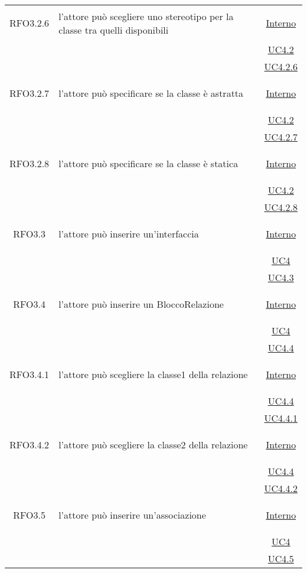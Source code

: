 \begin{longtable}{|c|>{\centering}m{7cm}|c|}
\hypertarget{RFO3.2.6}{RFO3.2.6} & l'attore può scegliere uno stereotipo per la classe tra quelli disponibili & \hyperlink{Interno}{Interno}\\
& &\hyperref[UC4.2]{UC4.2}\\
& &\hyperref[UC4.2.6]{UC4.2.6}\\ \hline

\hypertarget{RFO3.2.7}{RFO3.2.7} & l'attore può specificare se la classe è astratta & \hyperlink{Interno}{Interno}\\
& &\hyperref[UC4.2]{UC4.2}\\
& &\hyperref[UC4.2.7]{UC4.2.7}\\ \hline

\hypertarget{RFO3.2.8}{RFO3.2.8} & l'attore può specificare se la classe è statica & \hyperlink{Interno}{Interno}\\
& &\hyperref[UC4.2]{UC4.2}\\
& &\hyperref[UC4.2.8]{UC4.2.8}\\ \hline

\hypertarget{RFO3.3}{RFO3.3} & l'attore può inserire un'interfaccia &  \hyperlink{Interno}{Interno}\\
& &\hyperref[UC4]{UC4}\\
& &\hyperref[UC4.3]{UC4.3}\\ \hline

\hypertarget{RFO3.4}{RFO3.4} & l'attore può inserire un BloccoRelazione &  \hyperlink{Interno}{Interno}\\
& &\hyperref[UC4]{UC4}\\
& &\hyperref[UC4.4]{UC4.4}\\ \hline

\hypertarget{RFO3.4.1}{RFO3.4.1} & l'attore può scegliere la classe1 della relazione &  \hyperlink{Interno}{Interno}\\
& &\hyperref[UC4.4]{UC4.4}\\
& &\hyperref[UC4.4.1]{UC4.4.1}\\ \hline

\hypertarget{RFO3.4.2}{RFO3.4.2} & l'attore può scegliere la classe2 della relazione &  \hyperlink{Interno}{Interno}\\
& &\hyperref[UC4.4]{UC4.4}\\
& &\hyperref[UC4.4.2]{UC4.4.2}\\ \hline

\hypertarget{RFO3.5}{RFO3.5} & l'attore può inserire un'associazione &  \hyperlink{Interno}{Interno}\\
& &\hyperref[UC4]{UC4}\\
& &\hyperref[UC4.5]{UC4.5}\\ \hline


\end{longtable}
